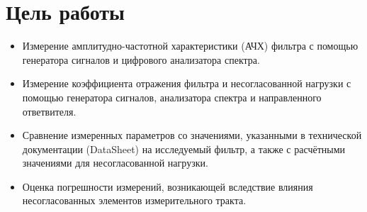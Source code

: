 \section{Цель работы}
\begin{itemize}
    \item Измерение амплитудно-частотной характеристики (АЧХ) фильтра с помощью генератора сигналов и цифрового анализатора спектра.
    \item Измерение коэффициента отражения фильтра и несогласованной нагрузки с помощью генератора сигналов, анализатора спектра и направленного ответвителя.
    \item Сравнение измеренных параметров со значениями, указанными в технической документации (DataSheet) на исследуемый фильтр, а также с расчётными значениями для несогласованной нагрузки.
    \item Оценка погрешности измерений, возникающей вследствие влияния несогласованных элементов измерительного тракта.
\end{itemize}
